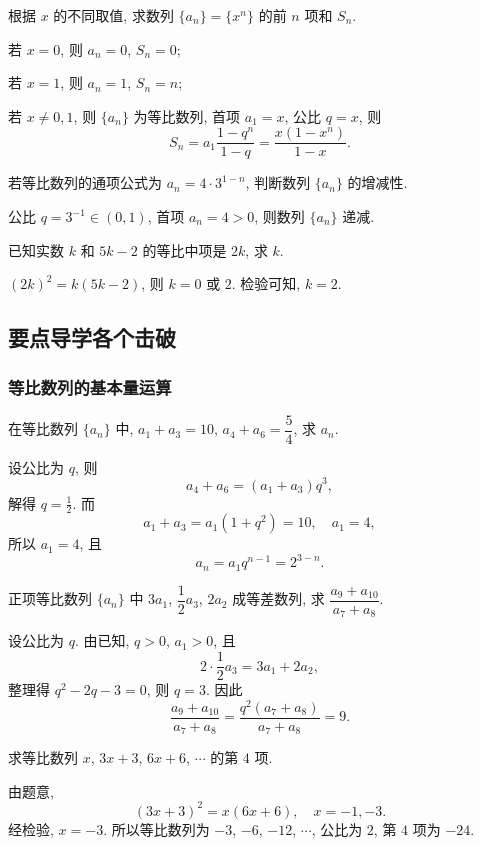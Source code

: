\begin{exercise}
    根据 $x$ 的不同取值, 求数列 $\{a_n\}=\{x^n\}$ 的前 $n$ 项和 $S_n$.
\end{exercise}
\beginsolution
    若 $x=0$, 则 $a_n= 0$, $S_n=0$;

    若 $x=1$, 则 $a_n= 1$, $S_n=n$;

    若 $x\neq0,1$, 则 $\{a_n\}$ 为等比数列, 首项 $a_1= x$, 公比 $q=x$, 则
    \[S_n= a_1\frac{1-q^n}{1-q}= \frac{x(1-x^n)}{1-x}.\]
\endsolution

\begin{exercise}
    若等比数列的通项公式为 $a_n=4\cdot 3^{1-n}$, 判断数列 $\{a_n\}$ 的增减性.
\end{exercise}
\beginsolution
    公比 $q= 3^{-1}\in(0,1)$, 首项 $a_n= 4>0$, 则数列 $\{a_n\}$ 递减.
\endsolution

\begin{exercise}
    已知实数 $k$ 和 $5k-2$ 的等比中项是 $2k$, 求 $k$.
\end{exercise}
\beginsolution
    $(2k)^2= k(5k-2)$, 则 $k=0$ 或 $2$. 检验可知, $k=2$.
\endsolution

\subsection{要点导学\quad 各个击破}
\subsubsection{等比数列的基本量运算}
\begin{example}
    在等比数列 $\{a_n\}$ 中, $a_1+a_3 =10$, $a_4 +a_6 =\dfrac54$, 求 $a_n$.
\end{example}
\beginsolution
    设公比为 $q$, 则
    \[a_4 +a_6= (a_1+a_3)q^3,\]
    解得 $q=\frac12$. 而
    \[a_1+a_3= a_1(1+q^2)= 10,\quad a_1= 4,\]
    所以 $a_1= 4$, 且
    \[a_n= a_1q^{n-1}= 2^{3-n}.\]
\endsolution

\begin{example}
    正项等比数列 $\{a_n\}$ 中 $3a_1$, $\dfrac12 a_3$, $2a_2$ 成等差数列, 求 $\dfrac{a_9+a_{10}}{a_7+a_8}$.
\end{example}
\beginsolution
    设公比为 $q$. 由已知, $q>0$, $a_1>0$, 且
    \[2\cdot \frac12 a_3= 3a_1+2a_2,\]
    整理得 $q^2-2q-3=0$, 则 $q=3$. 因此
    \[\dfrac{a_9+a_{10}}{a_7+a_8}
        = \dfrac{q^2(a_7+a_8)}{a_7+a_8}
        = 9.\]
\endsolution

\lianxi
\begin{exercise}
    求等比数列 $x$, $3x+3$, $6x+6$, $\cdots$ 的第 $4$ 项.
\end{exercise}
\beginsolution
    由题意, 
    \[(3x+3)^2= x(6x+6),\quad x=-1,-3.\]
    经检验, $x=-3$. 所以等比数列为 $-3$, $-6$, $-12$, $\cdots$, 公比为 $2$, 第 $4$ 项为 $-24$.
\endsolution

